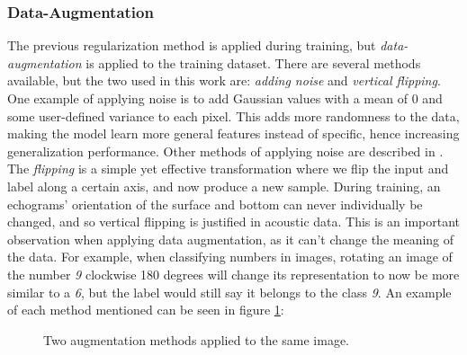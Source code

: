 \subsubsection{Data-Augmentation} \label{data-augmentation}
    The previous regularization method is applied during training, but \textit{data-augmentation} is applied to the training dataset\cite{kukavcka2017_regularization}. There are several methods available, but the two used in this work are: \textit{adding noise} and \textit{vertical flipping}. One example of applying noise is to add Gaussian values with a mean of 0 and some user-defined variance to each pixel. This adds more randomness to the data, making the model learn more general features instead of specific, hence increasing generalization performance. Other methods of applying noise are described in \citeauthor{kukavcka2017_regularization}\cite{kukavcka2017_regularization}. The \textit{flipping} is a simple yet effective transformation where we flip the input and label along a certain axis, and now produce a new sample. During training, an echograms' orientation of the surface and bottom can never individually be changed, and so vertical flipping is justified in acoustic data. This is an important observation when applying data augmentation, as it can't change the meaning of the data. For example, when classifying numbers in images, rotating an image of the number \textit{9} clockwise 180 degrees will change its representation to now be more similar to a \textit{6}, but the label would still say it belongs to the class \textit{9}. An example of each method mentioned can be seen in figure \ref{data augmentation fig}:
    
    \begin{figure}[H]
        \centering
        
        
        
        
        \caption[Two data augmentation examples]{Two augmentation methods applied to the same image.}
        \label{data augmentation fig}
        
        \end{figure}
    
